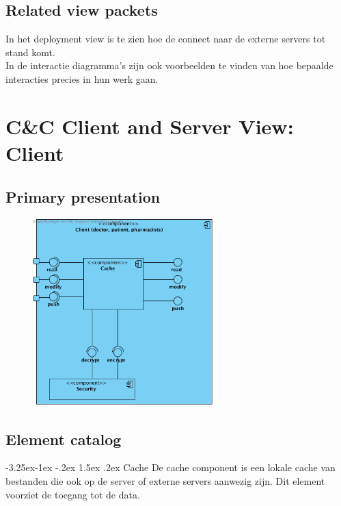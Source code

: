 \documentclass[a4paper,10pt]{book}
\makeatletter
\renewcommand\paragraph{\@startsection{paragraph}{4}{\z@}%
  {-3.25ex\@plus -1ex \@minus -.2ex}%
  {1.5ex \@plus .2ex}%
  {\normalfont\normalsize\bfseries}}
\makeatother
\begin{document}
\subsection{Related view packets}
In het deployment view is te zien hoe de connect naar de externe servers tot stand komt.\\
In de interactie diagramma's zijn ook voorbeelden te vinden van hoe bepaalde interacties precies in hun werk gaan.


\section{C\&C Client and Server View: Client}
\label{Client and Server View: Client}

\subsection{Primary presentation}

\begin{center}
    \begin{figure}
      \includegraphics[width=70mm]{../images/ClientServer_Client.png}
    \end{figure}
  \end{center}

\subsection{Element catalog}

\paragraph{Cache}
De cache component is een lokale cache van bestanden die ook op de server of externe servers aanwezig zijn.  Dit element voorziet de toegang tot de data.
\end{document}
